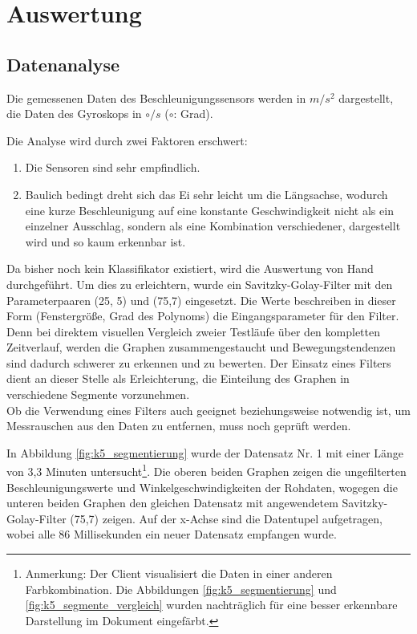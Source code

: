 \section{Auswertung}

\subsection{Datenanalyse}
Die gemessenen Daten des Beschleunigungssensors werden in $m/s^{2}$ 
dargestellt, die Daten des Gyroskops in $\circ/s$ ($\circ$:  Grad).

Die Analyse wird durch zwei Faktoren erschwert:
\begin{enumerate}
	\item Die Sensoren sind sehr empfindlich.
	\item Baulich bedingt dreht sich das Ei sehr leicht um die Längsachse, wodurch eine kurze Beschleunigung auf eine konstante Geschwindigkeit nicht als ein einzelner Ausschlag, sondern als eine Kombination verschiedener, dargestellt wird und so kaum erkennbar ist.
\end{enumerate}

Da bisher noch kein Klassifikator existiert, wird die Auswertung von Hand durchgeführt. Um dies zu erleichtern, wurde ein Savitzky-Golay-Filter mit den Parameterpaaren (25, 5) und (75,7) eingesetzt. Die Werte beschreiben in dieser Form (Fenstergröße, Grad des Polynoms) die Eingangsparameter für den Filter. Denn bei direktem visuellen Vergleich zweier Testläufe über den kompletten Zeitverlauf, werden die Graphen zusammengestaucht und Bewegungstendenzen sind dadurch schwerer zu erkennen und zu bewerten. Der Einsatz eines Filters dient an dieser Stelle als Erleichterung, die Einteilung des Graphen in verschiedene Segmente vorzunehmen. \\
Ob die Verwendung eines Filters auch geeignet beziehungsweise notwendig ist, um Messrauschen aus den Daten zu entfernen, muss noch geprüft werden.

In Abbildung \ref{fig:k5_segmentierung} wurde der Datensatz Nr. 1 mit einer Länge von 3,3 Minuten untersucht\footnote{Anmerkung: Der Client visualisiert die Daten in einer anderen Farbkombination. Die Abbildungen \ref{fig:k5_segmentierung} und \ref{fig:k5_segmente_vergleich} wurden nachträglich für eine besser erkennbare Darstellung im Dokument eingefärbt.}. Die oberen beiden Graphen zeigen die ungefilterten Beschleunigungswerte und Winkelgeschwindigkeiten der Rohdaten, wogegen die unteren beiden Graphen den gleichen Datensatz mit angewendetem Savitzky-Golay-Filter (75,7) zeigen. Auf der x-Achse sind die Datentupel aufgetragen, wobei alle 86 Millisekunden ein neuer Datensatz empfangen wurde.

